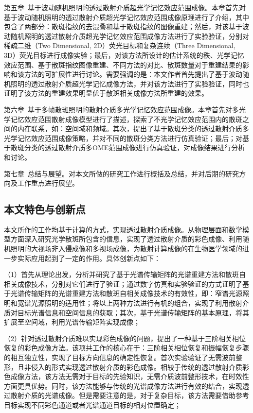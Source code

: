 第五章\  基于波动随机照明的透过散射介质超光学记忆效应范围成像。本章首先对基于波动随机照明的透过散射介质超光学记忆效应范围成像原理进行了介绍，其中包含了两部分：散斑指纹的去混叠和基于散斑指纹的图像重建；然后，对该基于波动随机照明的透过散射介质超光学记忆效应范围成像方法进行了实验验证，分别对稀疏二维（Two Dimensional, 2D）荧光目标和复杂连续（Three Dimensional, 3D）荧光目标进行成像实验；最后，对该方法所设计的估计系统的秩、光学记忆效应范围、基于散斑指纹图像重建、不同方法的对比、散斑数量对于重建结果的影响和该方法的可扩展性进行讨论。需要强调的是：本文作者首先提出了基于波动随机照明的透过散射介质超光学记忆成像方法，并对该方法进行了实验验证，同时也证明了该方法的重建效果明显优于散斑相关成像方法所重建的效果。

第六章\ 基于多帧散斑照明的散射介质多光学记忆效应范围成像。本章首先对多光学记忆效应范围散射成像模型进行了描述，探索了不光学记忆效应范围内的散斑之间的内在联系，如：空间域和频域。其次，提出了基于散斑分类的透过散射介质多光学记忆效应范围成像策略，并对不同的散斑分类方法进行仿真验证；最后；对基于散斑分类的透过散射介质多OME范围成像进行仿真验证，对成像结果进行分析和讨论。

第七章\ 总结与展望。对本文所做的研究工作进行概括及总结，并对后期的研究方向及工作重点进行展望。

\subsection{本文特色与创新点}

本文所作的工作均基于计算的方式，实现透过散射介质成像。从物理层面和数学模型方面深入研究光学散斑所包含的信息，实现了透过散射介质的彩色成像、利用随机照明的大视场非入侵成像和多视场成像，为散射计算成像的在生物医学领域的进一步实际应用起到了一定的作用。具体创新点如下：

（1）首先从理论出发，分析并研究了基于光谱传输矩阵的光谱重建方法和散斑自相关成像技术，分别对它们进行了验证；通过数字仿真和实验验证的方式证明了基于光谱传输矩阵的光谱重建方法和散斑自相关成像技术的有效性，即：窄谱光源照明和宽谱光源照明的适用性；将以上两种方法进行有机的组合，实现了利用散射介质对目标光谱信息和空间信息的获取；其次，基于光谱传输矩阵的基本原理，将其扩展至空间域，利用光谱传输矩阵实现成像；

（2）针对透过散射介质难以实现彩色成像的问题，提出了一种基于三阶相关相位恢复的彩色成像方法。该项共工作的核心在于：三阶相关相位恢复和振幅恢复步骤的相互独立性，实现了目标方向信息的确定性恢复。首次实验验证了无需波前整形，且非侵入的形式实现透过散射介质的彩色成像。相较于传统的透过散射介质彩色成像方法，该方法无需对于目标的先验知识，无需介质波前整形技术，在时效性方面更具优势。同时，该方法能够与传统的光谱成像方法进行有效的结合，实现透过散射介质的光谱成像。但是需要注意的是，对于复杂目标，该方法需要借助参考目标实现不同彩色通道或者光谱通道目标的相对位置确定；

